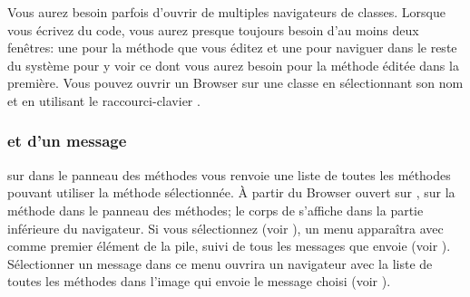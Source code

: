 \documentclass[a4paper,10pt,twoside]{book}
\begin{document}
Vous aurez besoin parfois d'ouvrir de multiples navigateurs de classes.
Lorsque vous écrivez du code, vous aurez presque toujours besoin d'au moins deux
fenêtres: une pour la méthode que vous éditez et une pour naviguer
dans le reste du système pour y voir ce dont vous aurez besoin pour la
méthode éditée dans la première. %
Vous pouvez ouvrir un Browser sur une classe en sélectionnant son nom et en
utilisant le raccourci-clavier  .


\subsubsection{\Senders et \implementors d'un message}


\Actclick sur  dans le
panneau des méthodes vous renvoie une liste de toutes les méthodes
pouvant utiliser la méthode sélectionnée. À partir du Browser
ouvert sur , \clickz sur la méthode  
dans le panneau des méthodes; le corps de  s'affiche dans
la partie inférieure du navigateur.
Si vous sélectionnez  (voir ), un 
menu apparaîtra avec  comme premier élément de
la pile,  suivi de tous les messages que 
 envoie (voir ). %
Sélectionner un message dans ce menu ouvrira un navigateur avec la
liste de toutes les méthodes dans l'image qui envoie le message
choisi (voir ).


\end{document}
